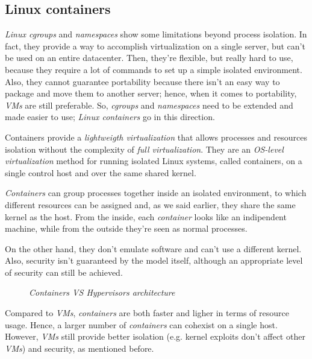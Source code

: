\subsection{Linux containers}
\emph{Linux cgroups} and \emph{namespaces} show some limitations beyond
process isolation. In fact, they provide a way to accomplish virtualization on
a single server, but can't be used on an entire datacenter. Then, they're
flexible, but really hard to use, because they require a lot of commands to
set up a simple isolated environment. Also, they cannot guarantee portability
because there isn't an easy way to package and move them to another server;
hence, when it comes to portability, \emph{VMs} are still preferable. So, \emph{cgroups}
and \emph{namespaces} need to be extended and made easier to use; \emph{Linux
containers} go in this direction.

Containers provide a \emph{lightweigth virtualization} that allows processes and
resources isolation without the complexity of \emph{full virtualization}. They
are an \emph{OS-level virtualization} method for running isolated Linux
systems, called containers, on a single control host and over the same shared
kernel.

\emph{Containers} can group processes together inside an isolated environment,
to which different resources can be assigned and, as we said earlier, they share
the same kernel as the host. From the inside, each \emph{container} looks like
an indipendent machine, while from the outside they're seen as normal processes.

On the other hand, they don't emulate software and can't use a different kernel.
Also, security isn't guaranteed by the model itself, although an appropriate
level of security can still be achieved.

\begin{figure}[ht!]
    \centering
    \hspace{2.5cm}
    \caption{\emph{Containers VS Hypervisors architecture}}
\end{figure}

\noindent
Compared to \emph{VMs}, \emph{containers} are both faster and ligher in terms of
resource usage. Hence, a larger number of \emph{containers} can cohexist on
a single host. However, \emph{VMs} still provide better isolation (e.g. kernel
exploits don't affect other \emph{VMs}) and security, as mentioned before.

